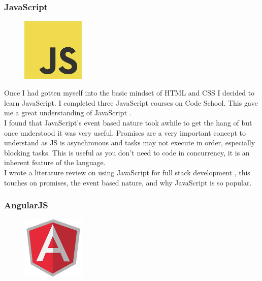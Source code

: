 \subsubsection{JavaScript}
\begin{figure}
\includegraphics[width=3cm]{img/mobile-app/logos/JS.png}
\end{figure} 
Once I had gotten myself into the basic mindset of HTML and CSS I decided to learn JavaScript.
I completed three JavaScript courses \cite{codeschool_js} on Code  School.
This gave me a great understanding of JavaScript \cite{javascript}.
\\
I found that JavaScript's event based nature took awhile to get the hang of but once understood it was very useful. 
Promises are a very important concept to understand as JS is asynchronous and tasks may not execute in order, especially blocking tasks.
This is useful as you don't need to code in concurrency, it is an inherent feature of the language.
\\
I wrote a literature review on using JavaScript for full stack development \cite{js_advantages_full_stack}, this touches on promises, the event based nature, and why JavaScript is so popular.

\subsubsection{AngularJS}
\begin{figure}
	\includegraphics[width=3cm]{img/mobile-app/logos/angular.jpg}
	\centering
\end{figure}

